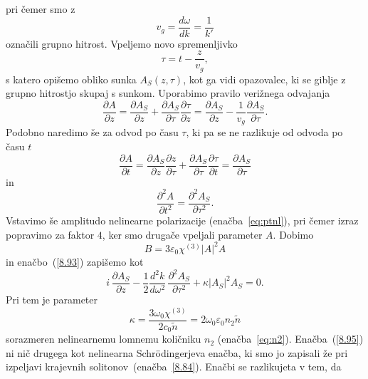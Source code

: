 pri čemer smo z 
\begin{equation}
 v_g = \frac{d\omega}{dk} = \frac{1}{k'}
\end{equation}
označili grupno hitrost.
Vpeljemo novo spremenljivko 
\begin{equation}
\tau=t-\frac{z}{v_{g}},
\label{nelinver}
\end{equation}
s katero opišemo obliko sunka $A_S(z,\tau)$, kot ga vidi opazovalec, ki se giblje
z grupno hitrostjo skupaj s sunkom. Uporabimo pravilo verižnega odvajanja 
\begin{equation}
\frac{\partial A}{\partial z} = \frac{\partial A_S}{\partial z} + \frac{\partial A_S}{\partial \tau}
\frac{\partial \tau}{\partial z}
= \frac{\partial A_S}{\partial z} -\frac{1}{v_g} \frac{\partial A_S}{\partial \tau}.
\end{equation}
Podobno naredimo še za odvod po času $\tau$, ki pa se ne razlikuje od odvoda po času $t$
\begin{equation}
\frac{\partial A}{\partial t} = \frac{\partial A_S}{\partial z}\frac{\partial z}{\partial \tau}+
\frac{\partial A_S}{\partial \tau}\frac{\partial \tau}{\partial t} 
= \frac{\partial A_S}{\partial \tau} 
\end{equation}
in
\begin{equation}
\frac{\partial^2 A}{\partial t^2} = \frac{\partial^2 A_S}{\partial\tau^2}.
\end{equation}
Vstavimo še amplitudo nelinearne polarizacije (enačba~\ref{eq:ptnl}), pri čemer izraz popravimo
za faktor $4$, ker smo drugače vpeljali parameter $A$. Dobimo
\begin{equation}
B = 3\varepsilon_0\chi^{(3)} |A|^2 A
\end{equation}
in enačbo~(\ref{8.93}) zapišemo kot 
\begin{equation}
i\,\frac{\partial A_S}{\partial z}-\frac{1}{2}\frac{d^{2}k}{d\omega^{2}}\,
\frac{\partial^{2}A_S}{\partial\tau^{2}}+\kappa\left|A_S\right|^{2}A_S=0.
\label{8.95}
\end{equation}
Pri tem je parameter
\begin{equation}
\kappa = \frac{3\omega_0\chi^{(3)}}{2c_0 \tilde{n}} = 2 \omega_0 \varepsilon_0 n_2 \tilde{n}
\end{equation}
sorazmeren nelinearnemu lomnemu količniku $n_2$ 
(enačba~\ref{eq:n2}). Enačba~(\ref{8.95}) ni nič drugega kot nelinearna Schr\"odingerjeva 
enačba, ki smo jo 
zapisali že pri izpeljavi krajevnih solitonov~(enačba~\ref{8.84}). Enačbi se razlikujeta v tem, da
